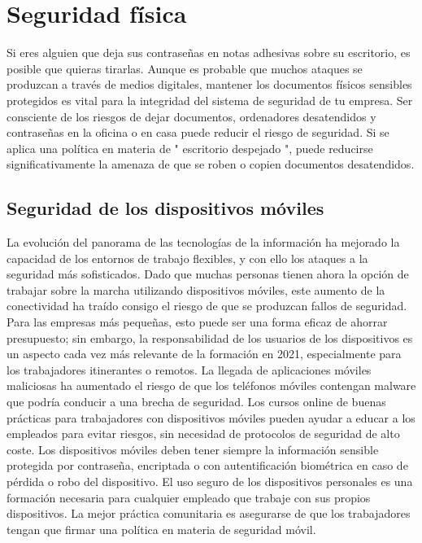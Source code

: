 \documentclass[
]{article}
\begin{document}
\hypertarget{seguridad-fuxedsica}{%
\section{Seguridad física}\label{seguridad-fuxedsica}}

Si eres alguien que deja sus contraseñas en notas adhesivas sobre su escritorio, es posible que quieras tirarlas. Aunque es probable que muchos ataques se produzcan a través de medios digitales, mantener los documentos físicos sensibles protegidos es vital para la integridad del sistema de seguridad de tu empresa.
Ser consciente de los riesgos de dejar documentos, ordenadores desatendidos y contraseñas en la oficina o en casa puede reducir el riesgo de seguridad. Si se aplica una política en materia de " escritorio despejado ", puede reducirse significativamente la amenaza de que se roben o copien documentos desatendidos.

\hypertarget{seguridad-de-los-dispositivos-muxf3viles}{%
\subsection{Seguridad de los dispositivos móviles}\label{seguridad-de-los-dispositivos-muxf3viles}}

La evolución del panorama de las tecnologías de la información ha mejorado la capacidad de los entornos de trabajo flexibles, y con ello los ataques a la seguridad más sofisticados. Dado que muchas personas tienen ahora la opción de trabajar sobre la marcha utilizando dispositivos móviles, este aumento de la conectividad ha traído consigo el riesgo de que se produzcan fallos de seguridad. Para las empresas más pequeñas, esto puede ser una forma eficaz de ahorrar presupuesto; sin embargo, la responsabilidad de los usuarios de los dispositivos es un aspecto cada vez más relevante de la formación en 2021, especialmente para los trabajadores itinerantes o remotos. La llegada de aplicaciones móviles maliciosas ha aumentado el riesgo de que los teléfonos móviles contengan malware que podría conducir a una brecha de seguridad.
Los cursos online de buenas prácticas para trabajadores con dispositivos móviles pueden ayudar a educar a los empleados para evitar riesgos, sin necesidad de protocolos de seguridad de alto coste. Los dispositivos móviles deben tener siempre la información sensible protegida por contraseña, encriptada o con autentificación biométrica en caso de pérdida o robo del dispositivo. El uso seguro de los dispositivos personales es una formación necesaria para cualquier empleado que trabaje con sus propios dispositivos.
La mejor práctica comunitaria es asegurarse de que los trabajadores tengan que firmar una política en materia de seguridad móvil.
\end{document}
